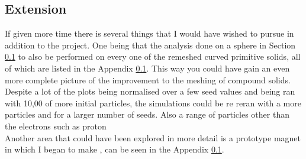 \documentclass[12pt,a4paper]{article}
\begin{document}
\subsection{Extension}
If given more time there is several things that I  would have wished to pursue in addition to the project. One being that the analysis done on a sphere in Section \ref{} to also be performed on every one of the remeshed curved primitive solids, all of which are listed in the Appendix \ref{}. This way you could have gain an even more complete picture of the improvement to the meshing of compound solids. Despite a lot of the plots being normalised over a few seed values and being ran with 10,00 of more initial particles, the simulations could be re reran with a more particles and for a larger number of seeds. Also a range of particles other than the electrons such as proton\\
Another area that could have been explored in more detail is a prototype magnet in which I began to make , can be seen in the Appendix \ref{}.
\end{document}
